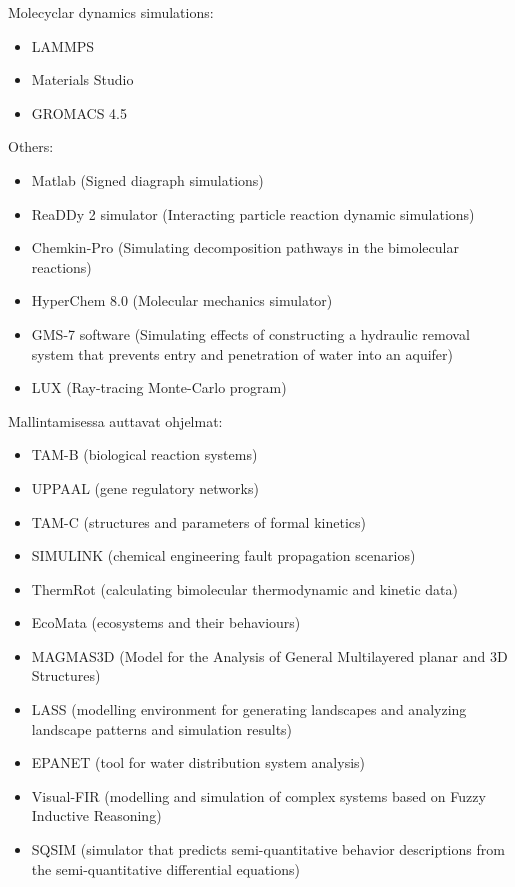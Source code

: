 \documentclass[utf8]{gradu3}
\begin{document}
Molecyclar dynamics simulations:
\begin{itemize}
    \item LAMMPS
    \item Materials Studio
    \item GROMACS 4.5
\end{itemize}

Others:
\begin{itemize}
    \item Matlab (Signed diagraph simulations)
    \item ReaDDy 2 simulator (Interacting particle reaction dynamic simulations)
    \item Chemkin-Pro (Simulating decomposition pathways in the bimolecular reactions)
    \item HyperChem 8.0 (Molecular mechanics simulator)
    \item GMS-7 software (Simulating effects of constructing a hydraulic removal system that prevents entry and penetration of water into an aquifer)
    \item LUX (Ray-tracing Monte-Carlo program)
\end{itemize}

Mallintamisessa auttavat ohjelmat:
\begin{itemize}
    \item TAM-B (biological reaction systems)
    \item UPPAAL (gene regulatory networks)
    \item TAM-C (structures and parameters of formal kinetics)
    \item SIMULINK (chemical engineering fault propagation scenarios)
    \item ThermRot (calculating bimolecular thermodynamic and kinetic data)
    \item EcoMata (ecosystems and their behaviours)
    \item MAGMAS3D (Model for the Analysis of General Multilayered planar and 3D Structures)
    \item LASS (modelling environment for generating landscapes and analyzing landscape patterns and simulation results)
    \item EPANET (tool for water distribution system analysis)
    \item Visual-FIR (modelling and simulation of complex systems based on Fuzzy Inductive Reasoning)
    \item SQSIM (simulator that predicts semi-quantitative behavior descriptions from the  semi-quantitative differential equations)
\end{itemize}
\end{document}
